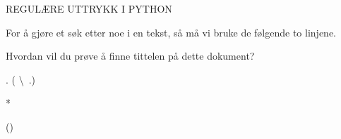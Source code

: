 \documentclass[onesided,norsk,11pt]{beamer}
\begin{document}
\begin{frame}
  REGULÆRE UTTRYKK I PYTHON
\end{frame}

\begin{frame}
  For å gjøre et søk etter noe i en tekst, så må vi bruke
  de følgende to linjene.
  
\end{frame}

\begin{frame}
  Hvordan vil du prøve å finne tittelen på
  dette dokument?
  
\end{frame}

\begin{frame}
\end{frame}

\begin{frame}
  
\end{frame}

\begin{frame}
  . ( \textbackslash~.)
\end{frame}

\begin{frame}
  *
\end{frame}

\begin{frame}
  ()
\end{frame}
\end{document}
